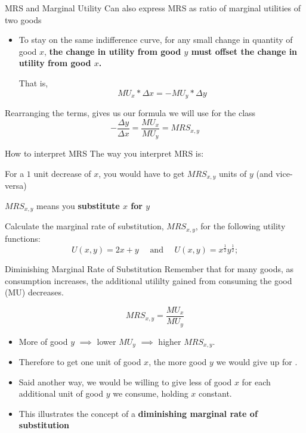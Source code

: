 \documentclass[11pt,t]{beamer}
\begin{document}
\begin{frame}{MRS and Marginal Utility}
  Can also express MRS as ratio of marginal utilities of two goods
  \begin{itemize}
    \item To stay on the same indifference curve, for any small change in quantity of good $x$, \textbf{the change in utility from good $y$ must offset the change in utility from good $x$.}
    
    That is, 
    $$
      MU_x * \Delta x = - MU_y * \Delta y
    $$ 
  \end{itemize}

  \pause\bigskip
  Rearranging the terms, gives us our formula we will use for the class 
  $$
    -\frac{\Delta y}{\Delta x} = \frac{MU_x}{MU_y} = MRS_{x,y}
  $$
\end{frame}

\begin{frame}{How to interpret MRS}
  The way you interpret MRS is: 
  
  \bigskip
  For a $1$ unit decrease of $x$, you would have to get $MRS_{x,y}$ units of $y$ (and vice-versa)
  

  \pause\bigskip
  $MRS_{x,y}$ means you \textbf{substitute $x$ for $y$}
\end{frame}

\begin{frame}

  \bigskip
  Calculate the marginal rate of substitution, $MRS_{x,y}$, for the following utility functions:
  $$
    U(x,y) = 2x + y \quad\text{ and }\quad U(x,y) = x^{\frac{1}{2}} y^{\frac{1}{2}};
  $$
\end{frame}

\begin{frame}
  
\end{frame}

\begin{frame}{Diminishing Marginal Rate of Substitution}
  Remember that for many goods, as consumption increases, the additional utililty gained from consuming the good (MU) decreases.

  $$
    MRS_{x,y} = \frac{MU_x}{MU_{y}}
  $$
  
  \begin{itemize}
    \item More of good $y$ $\implies$ lower $MU_{y}$ $\implies$ higher $MRS_{x,y}$. 
    
    \pause
    \item Therefore to get one unit of good $x$, the more good $y$ we would give up for . 

    \item Said another way, we would be willing to give less of good $x$ for each additional unit of good $y$ we consume, holding $x$ constant.
    
    \pause
    \item This illustrates the concept of a \textbf{diminishing marginal rate of substitution}
  \end{itemize}
\end{frame}
\end{document}
